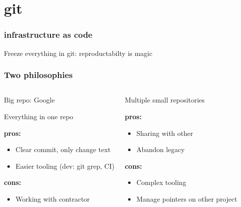 \documentclass{beamer}
\begin{document}
\section{git}

\begin{frame}
    \frametitle{infrastructure as code}
    \begin{block}{}
        Freeze everything in git: reproductabilty is magic
    \end{block}
\end{frame}

\begin{frame}
    \frametitle{Two philosophies}
    \begin{columns}
        \begin{block}{Big repo: Google}

        Everything in one repo

        \textbf {pros:} \\
            \begin{itemize}
                \item Clear commit, only change text
                \item Easier tooling (dev: git grep, CI)
            \end{itemize}
        \textbf {cons:} \\
            \begin{itemize}
                \item Working with contractor
            \end{itemize}
        \end{block}

        \begin{block}{Multiple small repositories}

        \textbf {pros:} \\
            \begin{itemize}
                \item Sharing with other
                \item Abandon legacy
            \end{itemize}
        \textbf {cons:} \\
            \begin{itemize}
                \item Complex tooling
                \item Manage pointers on other project
            \end{itemize}
        \end{block}

    \end{columns}
\end{frame}
\end{document}
